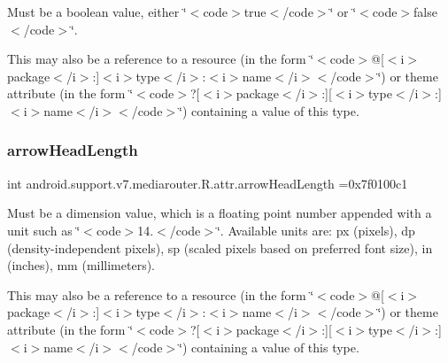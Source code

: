 Must be a boolean value, either \char`\"{}$<$code$>$true$<$/code$>$\char`\"{} or \char`\"{}$<$code$>$false$<$/code$>$\char`\"{}. 

This may also be a reference to a resource (in the form \char`\"{}$<$code$>$@\mbox{[}$<$i$>$package$<$/i$>$\+:\mbox{]}$<$i$>$type$<$/i$>$\+:$<$i$>$name$<$/i$>$$<$/code$>$\char`\"{}) or theme attribute (in the form \char`\"{}$<$code$>$?\mbox{[}$<$i$>$package$<$/i$>$\+:\mbox{]}\mbox{[}$<$i$>$type$<$/i$>$\+:\mbox{]}$<$i$>$name$<$/i$>$$<$/code$>$\char`\"{}) containing a value of this type. \mbox{\label{classandroid_1_1support_1_1v7_1_1mediarouter_1_1R_1_1attr_afd1b5286a8e70d08caaf90c36566c9e3}} 
\subsubsection{\texorpdfstring{arrow\+Head\+Length}{arrowHeadLength}}
{\footnotesize\ttfamily int android.\+support.\+v7.\+mediarouter.\+R.\+attr.\+arrow\+Head\+Length =0x7f0100c1\hspace{0.3cm}{\ttfamily [static]}}

Must be a dimension value, which is a floating point number appended with a unit such as \char`\"{}$<$code$>$14.\+5sp$<$/code$>$\char`\"{}. Available units are\+: px (pixels), dp (density-\/independent pixels), sp (scaled pixels based on preferred font size), in (inches), mm (millimeters). 

This may also be a reference to a resource (in the form \char`\"{}$<$code$>$@\mbox{[}$<$i$>$package$<$/i$>$\+:\mbox{]}$<$i$>$type$<$/i$>$\+:$<$i$>$name$<$/i$>$$<$/code$>$\char`\"{}) or theme attribute (in the form \char`\"{}$<$code$>$?\mbox{[}$<$i$>$package$<$/i$>$\+:\mbox{]}\mbox{[}$<$i$>$type$<$/i$>$\+:\mbox{]}$<$i$>$name$<$/i$>$$<$/code$>$\char`\"{}) containing a value of this type. \mbox{\label{classandroid_1_1support_1_1v7_1_1mediarouter_1_1R_1_1attr_a77de6186fb5c3e3ca0a06c6cf0059954}} 
